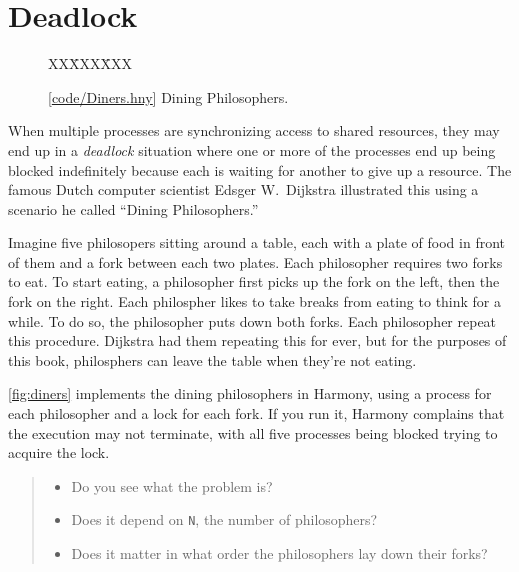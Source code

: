 \documentclass{report}
\newcommand{\harmonysource}[1]{
\begin{tabbing}
XX\=XXX\=XXX\kill
    
\end{tabbing}
}
\newcommand{\harmonylink}[1]{%
[\href{https://www.cs.cornell.edu/home/rvr/harmony/#1}{\underline{#1}}]%
}
\newenvironment{code}{
\tcolorbox
}{
\endtcolorbox
}
\begin{document}
\chapter{Deadlock}
\label{ch:deadlock}
%

%

\begin{figure}
\begin{code}
\harmonysource{Diners}
\end{code}
\caption{\harmonylink{code/Diners.hny} Dining Philosophers.}
\label{fig:diners}
\end{figure}

When multiple processes are synchronizing access to shared resources, they
may end up in a \emph{deadlock} situation where one or more of the processes
end up being blocked indefinitely because each is waiting for another to give
up a resource.
The famous Dutch computer scientist Edsger W.~Dijkstra illustrated this using
a scenario he called ``Dining Philosophers.''
%

Imagine five philosopers sitting around a table, each with a plate of food in
front of them and a fork between each two plates.  Each philosopher requires
two forks to eat.  To start eating, a philosopher first picks up the fork on
the left, then the fork on the right.  Each philospher likes to take breaks
from eating to think for a while.  To do so, the philosopher puts down both
forks.  Each philosopher repeat this procedure.  Dijkstra had them repeating
this for ever, but for the purposes of this book, philosphers can leave
the table when they're not eating.

\autoref{fig:diners} implements the dining philosophers in Harmony, using a
process for each philosopher and a lock for each fork.  If you
run it, Harmony complains that the execution may not terminate, with all five
processes being blocked trying to acquire the lock.

\begin{quote}
\begin{itemize}
\item Do you see what the problem is?
\item Does it depend on \texttt{N}, the number of philosophers?
\item Does it matter in what order the philosophers lay down their forks?
\end{itemize}
\end{quote}

\end{document}
